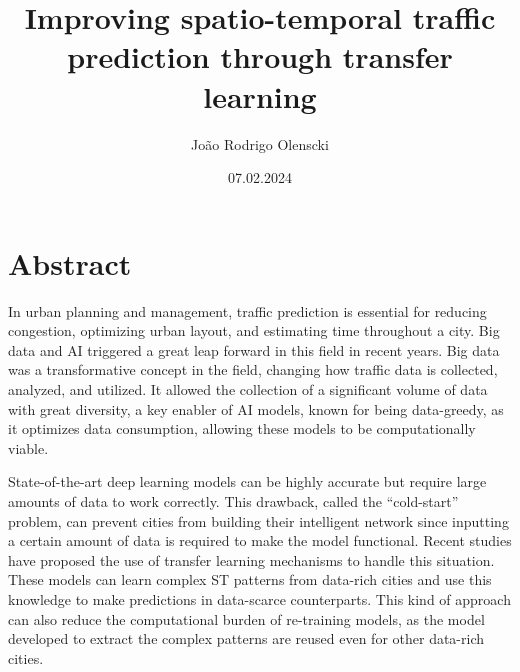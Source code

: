%
% 
% 
%



\renewcommand{\Thema}{Improving spatio-temporal traffic prediction through transfer learning}




\title{Improving spatio-temporal traffic prediction through transfer learning}
\author{João Rodrigo Olenscki}
\date{07.02.2024}


\chapter*{Abstract}

In urban planning and management, traffic prediction is essential for reducing congestion, optimizing urban layout, and estimating time throughout a city. Big data and \gls{AI} triggered a great leap forward in this field in recent years. Big data was a transformative concept in the field, changing how traffic data is collected, analyzed, and utilized. It allowed the collection of a significant volume of data with great diversity, a key enabler of \gls{AI} models, known for being data-greedy, as it optimizes data consumption, allowing these models to be computationally viable. 

State-of-the-art deep learning models can be highly accurate but require large amounts of data to work correctly. This drawback, called the ``cold-start'' problem, can prevent cities from building their intelligent network since inputting a certain amount of data is required to make the model functional. Recent studies have proposed the use of transfer learning mechanisms to handle this situation. These models can learn complex \gls{ST} patterns from data-rich cities and use this knowledge to make predictions in data-scarce counterparts. This kind of approach can also reduce the computational burden of re-training models, as the model developed to extract the complex patterns are reused even for other data-rich cities.

